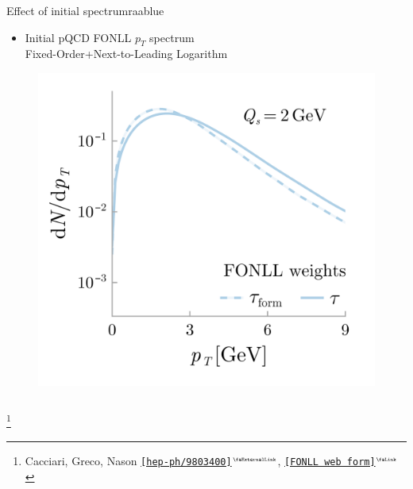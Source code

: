 \documentclass[aspectratio=169,11pt,usenames,dvipsnames]{beamer}
\renewcommand{\thefootnote}{\color{customblue}\faPaperPlaneO}
\newcommand\blfootnote[1]{%
  \begingroup
  \renewcommand\thefootnote{}\footnote{#1}%
  \addtocounter{footnote}{-1}%
  \endgroup
}
\begin{document}
\begin{frame}
\begin{columns}[onlytextwidth,t]
       \begin{center}
        \begin{custombox}{{\normalsize Effect of initial spectrum}}{raablue}
            \small
            \begin{varwidth}{0.9\textwidth}
            \begin{itemize}
                \itemsep0em
                \footnotesize
                \item Initial pQCD FONLL $p_T$ spectrum\\
                {\scriptsize\color{lightgray}Fixed-Order+Next-to-Leading Logarithm}
            \end{itemize}
            \end{varwidth}
        \end{custombox}

        \vspace{-13pt}
        \begin{figure}
            \centering
            \includegraphics[height=0.63\textheight]{images/final_sketch_raa_gl_fonll_v4_fonll.png}
        \end{figure}

       \end{center}
    \end{columns}

    \blfootnote{\scriptsize Cacciari, Greco, Nason \href{https://arxiv.org/abs/hep-ph/9803400}{{\color{palgold}\texttt{[hep-ph/9803400]$^\text{\tiny\faExternalLink}$}}}, \href{https://www.lpthe.jussieu.fr/~cacciari/fonll/fonllform.html}{{\color{raablue}\texttt{[FONLL web form]$^\text{\tiny\faLink}$}}}}
\end{frame}
\end{document}
